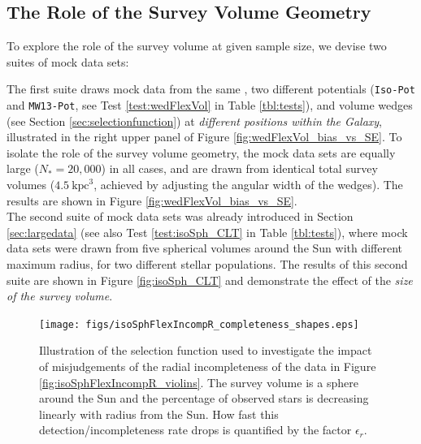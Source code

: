 \subsection{The Role of the Survey Volume Geometry} \label{sec:results_obsvolume}


To explore the role of the survey volume at given sample size, we devise two suites of mock data sets: 

The first suite draws mock data from the same \pmodel{}, two different potentials (\texttt{Iso-Pot} and \texttt{MW13-Pot}, see Test \ref{test:wedFlexVol} in Table \ref{tbl:tests}), and volume wedges (see Section \ref{sec:selectionfunction}) at {\it different positions within the Galaxy}, illustrated in the right upper panel of Figure \ref{fig:wedFlexVol_bias_vs_SE}. To isolate the role of the survey volume geometry, the mock data sets are equally large ($N_{*} = 20,000$) in all cases, and are drawn from identical total survey volumes ($4.5~\text{kpc}^3$, achieved by adjusting the angular width of the wedges). The results are shown in Figure \ref{fig:wedFlexVol_bias_vs_SE}.
\\The second suite of mock data sets was already introduced in Section \ref{sec:largedata} (see also Test \ref{test:isoSph_CLT} in Table \ref{tbl:tests}), where mock data sets were drawn from five spherical volumes around the Sun with different maximum radius, for two different stellar populations. The results of this second suite are shown in Figure \ref{fig:isoSph_CLT} and demonstrate the effect of the {\it size of the survey volume}.



\begin{figure}[!htbp]
\centering
\texttt{[image: figs/isoSphFlexIncompR\_completeness\_shapes.eps]}
\caption{Illustration of the selection function used to investigate the impact of misjudgements of the radial incompleteness of the data in Figure \ref{fig:isoSphFlexIncompR_violins}. The survey volume is a sphere around the Sun and the percentage of observed stars is decreasing linearly with radius from the Sun. How fast this detection/incompleteness rate drops is quantified by the factor $\epsilon_r$.} 
\label{fig:isoSphFlexIncompR_completeness_shapes}
\end{figure}

